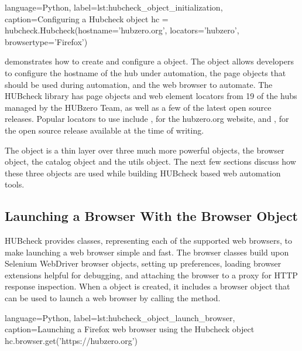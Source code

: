 \begin{xcode}{%
  language=Python,%
  label=lst:hubcheck_object_initialization,%
  caption={Configuring a Hubcheck object}%
}
hc = hubcheck.Hubcheck(hostname='hubzero.org',
                       locators='hubzero',
                       browsertype='Firefox')
\end{xcode}

 demonstrates how to create and
configure a  object. The object allows developers to
configure the hostname of the hub under automation, the page objects that
should be used during automation, and the web browser to automate. The HUBcheck
library has page objects and web element locators from 19 of the hubs managed
by the HUBzero Team, as well as a few of the latest open source
releases. Popular locators to use include , for the hubzero.org
website, and , for the open source release available at
the time of writing.


The  object is a thin layer over three much more powerful
objects, the browser object, the catalog object and the utils object. The next
few sections discuss how these three objects are used while building HUBcheck
based web automation tools.

\subsection{Launching a Browser With the Browser Object}
\label{ssec:hubcheck_web_modules_launch_browser}

HUBcheck provides classes, representing each of the supported web browsers, to
make launching a web browser simple and fast.  The browser classes build upon
Selenium WebDriver browser objects, setting up preferences, loading browser
extensions helpful for debugging, and attaching the browser to a proxy for HTTP
response inspection.  When a  object is created, it includes
a browser object that can be used to launch a web browser by calling the
 method.

\begin{xcode}{%
  language=Python,%
  label=lst:hubcheck_object_launch_browser,%
  caption={Launching a Firefox web browser using the Hubcheck object}%
}
hc.browser.get('https://hubzero.org')
\end{xcode}

